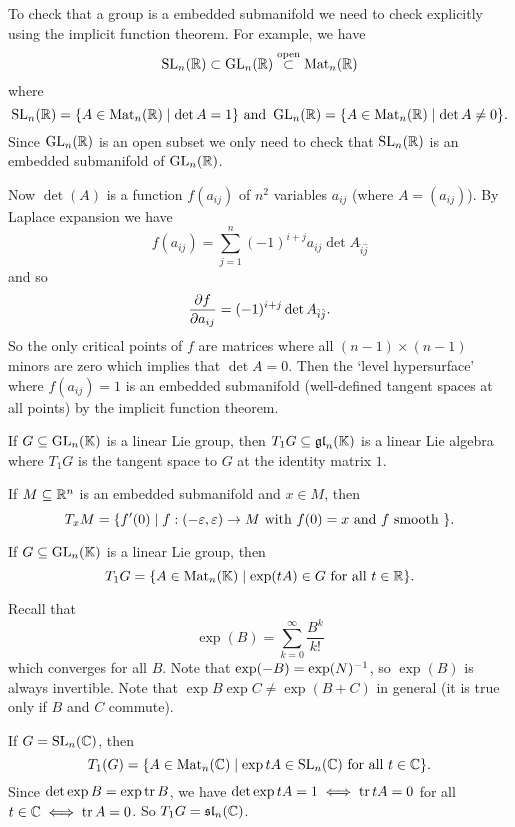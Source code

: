 \begin{exam}
  To check that a group is a embedded submanifold we need to check explicitly using the implicit function theorem.
  For example, we have
  \[ \operatorname{SL}_n(\mathbb{R}) \subset \operatorname{GL}_n(\mathbb{R}) \overset{\text{open}}{\subset} \operatorname{Mat}_n(\mathbb{R}) \]
  where
  \[ \operatorname{SL}_n(\mathbb{R}) = \{ A \in \operatorname{Mat}_n(\mathbb{R}) \mid \det A = 1 \} \text{ and } \operatorname{GL}_n(\mathbb{R}) = \{ A \in \operatorname{Mat}_n(\mathbb{R}) \mid \det A \neq 0 \}. \]
  Since $\operatorname{GL}_n(\mathbb{R})$ is an open subset we only need to check that $\operatorname{SL}_n(\mathbb{R})$ is an embedded submanifold of $\operatorname{GL}_n(\mathbb{R})$.

  Now $\det(A)$ is a function $f(a_{ij})$ of $n^2$ variables $a_{ij}$ (where $A=(a_{ij})$).
  By Laplace expansion we have
  \[ f(a_{ij}) = \sum_{j=1}^n (-1)^{i+j} a_{ij} \det A_{\hat i \hat j} \]
  and so
  \[ \frac{\partial f}{\partial a_{ij}} = (-1)^{i+j} \det A_{\hat i \hat j}. \]
  So the only critical points of $f$ are matrices where all $(n-1) \times (n-1)$ minors are zero which implies that $\det A=0$.
  Then the `level hypersurface' where $f(a_{ij})=1$ is an embedded submanifold (well-defined tangent spaces at all points) by the implicit function theorem.
\end{exam}

\begin{prop}
  If $G \subseteq \operatorname{GL}_n(\mathbb{K})$ is a linear Lie group, then $T_1G \subseteq \operatorname{\mathfrak{gl}}_n(\mathbb{K})$ is a linear Lie algebra where $T_1G$ is the tangent space to $G$ at the identity matrix $1$.
\end{prop}

\begin{defn}
  If $M \subseteq \mathbb{R}^n$ is an embedded submanifold and $x \in M$, then
  \[ T_xM = \{ f'(0) \mid f: (-\varepsilon,\varepsilon) \to M \text{ with } f(0)=x \text{ and } f \text{ smooth } \}. \]
  
  If $G \subseteq \operatorname{GL}_n(\mathbb{K})$ is a linear Lie group, then
  \[ T_1G = \{ A \in \operatorname{Mat}_n(\mathbb{K}) \mid \exp(tA) \in G \text{ for all } t \in \mathbb{R} \}. \]
\end{defn}

\begin{rmk}
  Recall that
  \[ \exp(B) = \sum_{k=0}^\infty \frac{B^k}{k!} \]
  which converges for all $B$.
  Note that $\exp(-B)=\exp(N)^{-1}$, so $\exp(B)$ is always invertible.
  Note that $\exp B \exp C \neq \exp(B+C)$ in general (it is true only if $B$ and $C$ commute).
\end{rmk}

\begin{exam}
  If $G=\operatorname{SL}_n(\mathbb{C})$, then
  \[ T_1(G) = \{ A \in \operatorname{Mat}_n(\mathbb{C}) \mid \exp tA \in \operatorname{SL}_n(\mathbb{C}) \text{ for all } t \in \mathbb{C} \}. \]
  Since $\det\exp B = \exp\operatorname{tr} B$, we have $\det\exp tA = 1 \iff \operatorname{tr} tA = 0$ for all $t \in \mathbb{C} \iff \operatorname{tr} A=0$.
  So $T_1G = \operatorname{\mathfrak{sl}}_n(\mathbb{C})$.
\end{exam}

